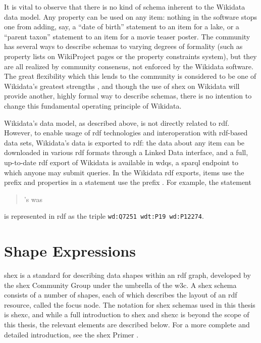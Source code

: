 It is vital to observe that there is no kind of \gls{schema} inherent to the \gls{Wikidata} data model.
Any \gls{property} can be used on any \gls{item}:
nothing in the software stops one from adding, say,
a “date of birth” \gls{statement} to an \gls{item} for a lake,
or a “parent taxon” \gls{statement} to an \gls{item} for a movie teaser poster.
The community has several ways to describe \glspl{schema} to varying degrees of formality
(such as \gls{property} lists on WikiProject pages or the property constraints system),
but they are all realized by community consensus,
not enforced by the \gls{Wikidata} software.
The great flexibility which this lends to the community
is considered to be one of \gls{Wikidata}’s greatest strengths \cite{vrandecic-restricting-the-world},
and though the use of \acrlong{shex}
on \gls{Wikidata} will provide another,
highly formal way to describe \glspl{schema},
there is no intention to change this fundamental operating principle of \gls{Wikidata}.

\Gls{Wikidata}’s data model, as described above,
is not directly related to \gls{rdf}.
However, to enable usage of \gls{rdf} technologies and interoperation with \gls{rdf}-based data sets,
\gls{Wikidata}’s data is exported to \gls{rdf}:
the data about any \gls{item} can be downloaded in various \gls{rdf} formats through a \gls{Linked Data} interface,
and a full, up-to-date \gls{rdf} export of \gls{Wikidata} is available in \gls{wdqs},
a \gls{sparql} endpoint to which anyone may submit queries.
In the \gls{Wikidata} \gls{rdf} exports,
items use the \gls{prefix}  and properties in a statement use the \gls{prefix} .
For example, the statement
\begin{quotation}
  ’s  was 
\end{quotation}
is represented in \gls{rdf} as the \gls{triple} \lstinline[language=sparql]{wd:Q7251 wdt:P19 wd:P12274}.

\section{Shape Expressions}
\label{sec:Background:ShEx}

\acrfull{shex} \cite{shex}
is a standard for describing data shapes within an \gls{rdf} graph,
developed by the \gls{shex} Community Group under the umbrella of the \gls{w3c}.
A \gls{shex} \gls{schema} consists of a number of \glspl{shape},
each of which describes the layout of an \gls{rdf} \gls{resource},
called the \gls{focus node}.
The notation for \gls{shex} \glspl{schema} used in this thesis is \gls{shexc},
and while a full introduction to \gls{shex} and \gls{shexc} is beyond the scope of this thesis,
the relevant elements are described below.
For a more complete and detailed introduction,
see the \gls{shex} Primer \cite{shex-primer}.

